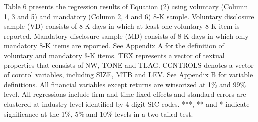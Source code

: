 \begin{table}[H]
\begin{footnotesize}
		\noindent Table 6 presents the regression results of Equation (2) using voluntary (Column 1, 3 and 5) and mandatory (Column 2, 4 and 6) 8-K sample. Voluntary disclosure sample (VD) consists of 8-K days in which at least one voluntary 8-K item is reported. Mandatory disclosure sample (MD) consists of 8-K days in which only mandatory 8-K items are reported. See \hyperref[appa]{Appendix A} for the definition of voluntary and mandatory 8-K items. TEX represents a vector of textual properties that consists of NW, TONE and TLAG. CONTROLS denotes a vector of control variables, including SIZE, MTB and LEV. See \hyperref[appb]{Appendix B} for variable definitions. All financial variables except returns are winsorized at 1\% and 99\% level. All regressions include firm and time fixed effects and standard errors are clustered at industry level identified by 4-digit SIC codes. ***, ** and * indicate significance at the 1\%, 5\% and 10\% levels in a two-tailed test.
	\end{footnotesize}
\end{table}%
